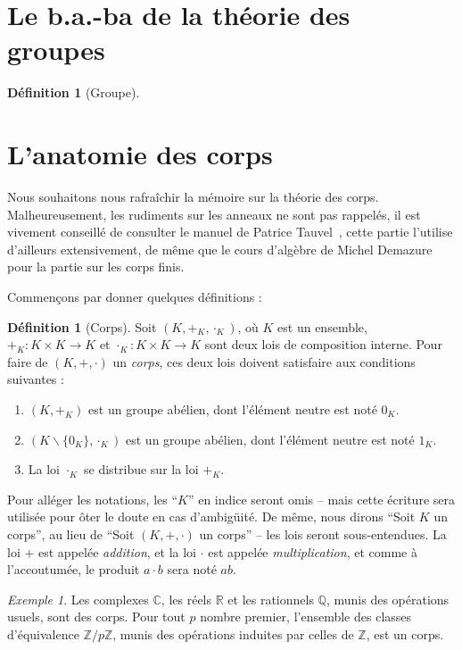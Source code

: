 \documentclass[a4paper, titlepage]{article}
\theoremstyle{definition}
\newtheorem{defi}[theo]{Définition}
\theoremstyle{remark}
\newtheorem{exem}[theo]{Exemple}
\def\Z{\mathbb Z}
\def\Q{\mathbb Q}
\def\R{\mathbb R}
\def\C{\mathbb C}
\begin{document}
\newpage
\appendix

\section{Le b.a.-ba de la théorie des groupes}
\begin{defi}[Groupe]

\end{defi}

\section{L'anatomie des corps}

Nous souhaitons nous rafraîchir la mémoire sur la théorie des corps. Malheureusement, les rudiments sur les anneaux ne sont pas rappelés, il est vivement conseillé de consulter le manuel de Patrice Tauvel~\cite{tauvel2008}, cette partie l'utilise d'ailleurs extensivement, de même que le cours d'algèbre de Michel Demazure~\cite{demazure2008} pour la partie sur les corps finis. 

Commençons par donner quelques définitions :

\begin{defi}[Corps]
Soit $(K,+_K,\cdot_K)$, où $K$ est un ensemble, $+_K : K \times K \rightarrow K$ et $\cdot_K: K \times K \rightarrow K$ sont deux lois de composition interne. Pour faire de $(K,+,\cdot)$ un \textit{corps}, ces deux lois doivent satisfaire aux conditions suivantes : \begin{enumerate}
\item $(K,+_K)$ est un groupe abélien, dont l'élément neutre est noté $0_K$.
\item $(K\backslash \{0_K\},\cdot_K)$ est un groupe abélien, dont l'élément neutre est noté $1_K$.
\item La loi $\cdot_K$ se distribue sur la loi $+_K$.
\end{enumerate}
\end{defi}

Pour alléger les notations, les ``$K$'' en indice seront omis -- mais cette écriture sera utilisée pour ôter le doute en cas d’ambigüité. De même, nous dirons ``Soit $K$ un corps'', au lieu de ``Soit $(K,+,\cdot)$ un corps'' -- les lois seront sous-entendues. La loi $+$ est appelée \textit{addition}, et la loi $\cdot$ est appelée \textit{multiplication}, et comme à l'accoutumée, le produit $a\cdot b$ sera noté $ab$.

\begin{exem}
Les complexes $\C$, les réels $\R$ et les rationnels $\Q$, munis des opérations usuels, sont des corps. Pour tout $p$ nombre premier, l'ensemble des classes d'équivalence $\Z/p\Z$, munis des opérations induites par celles de $\Z$, est un corps.
\end{exem}
\end{document}
